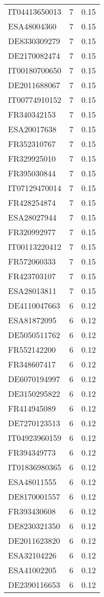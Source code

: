 \begin{table*}[htbp]
\begin{tabular}{lrr}
IT04413650013 & 7 & 0.15 \\
ESA48004360 & 7 & 0.15 \\
DE8330309279 & 7 & 0.15 \\
DE2170082474 & 7 & 0.15 \\
IT00180700650 & 7 & 0.15 \\
DE2011688067 & 7 & 0.15 \\
IT00774910152 & 7 & 0.15 \\
FR340342153 & 7 & 0.15 \\
ESA20017638 & 7 & 0.15 \\
FR352310767 & 7 & 0.15 \\
FR329925010 & 7 & 0.15 \\
FR395030844 & 7 & 0.15 \\
IT07129470014 & 7 & 0.15 \\
FR428254874 & 7 & 0.15 \\
ESA28027944 & 7 & 0.15 \\
FR320992977 & 7 & 0.15 \\
IT00113220412 & 7 & 0.15 \\
FR572060333 & 7 & 0.15 \\
FR423703107 & 7 & 0.15 \\
ESA28013811 & 7 & 0.15 \\
DE4110047663 & 6 & 0.12 \\
ESA81872095 & 6 & 0.12 \\
DE5050511762 & 6 & 0.12 \\
FR552142200 & 6 & 0.12 \\
FR348607417 & 6 & 0.12 \\
DE6070194997 & 6 & 0.12 \\
DE3150295822 & 6 & 0.12 \\
FR414945089 & 6 & 0.12 \\
DE7270123513 & 6 & 0.12 \\
IT04923960159 & 6 & 0.12 \\
FR394349773 & 6 & 0.12 \\
IT01836980365 & 6 & 0.12 \\
ESA48011555 & 6 & 0.12 \\
DE8170001557 & 6 & 0.12 \\
FR393430608 & 6 & 0.12 \\
DE8230321350 & 6 & 0.12 \\
DE2011623820 & 6 & 0.12 \\
ESA32104226 & 6 & 0.12 \\
ESA41002205 & 6 & 0.12 \\
DE2390116653 & 6 & 0.12 \\

\end{tabular}
\end{table*}

